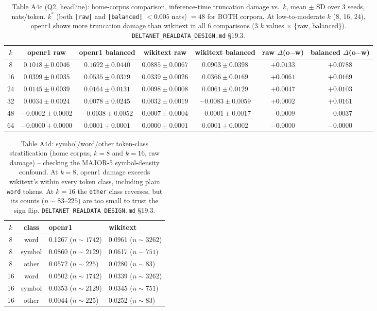 \begin{table}[htbp]
\centering
\small
\begin{tabular}{ccccccc}
\toprule
$k$ & openr1 raw & openr1 balanced & wikitext raw & wikitext balanced & raw $\Delta$(o$-$w) & balanced $\Delta$(o$-$w) \\
\midrule
8  & $0.1018\pm0.0046$ & $0.1692\pm0.0440$ & $0.0885\pm0.0067$ & $0.0903\pm0.0398$ & $+0.0133$ & $+0.0788$ \\
16 & $0.0399\pm0.0035$ & $0.0535\pm0.0379$ & $0.0339\pm0.0026$ & $0.0366\pm0.0169$ & $+0.0061$ & $+0.0169$ \\
24 & $0.0145\pm0.0039$ & $0.0164\pm0.0131$ & $0.0098\pm0.0008$ & $0.0061\pm0.0129$ & $+0.0047$ & $+0.0103$ \\
32 & $0.0034\pm0.0024$ & $0.0078\pm0.0245$ & $0.0032\pm0.0019$ & $-0.0083\pm0.0059$ & $+0.0002$ & $+0.0161$ \\
48 & $-0.0002\pm0.0002$ & $-0.0038\pm0.0052$ & $0.0007\pm0.0004$ & $-0.0001\pm0.0017$ & $-0.0009$ & $-0.0037$ \\
64 & $-0.0000\pm0.0000$ & $0.0001\pm0.0001$ & $0.0000\pm0.0001$ & $0.0001\pm0.0002$ & $-0.0000$ & $-0.0000$ \\
\bottomrule
\end{tabular}
\caption{Table A4c (Q2, headline): home-corpus comparison, inference-time
truncation damage vs.\ $k$, mean $\pm$ SD over 3 seeds, nats/token. $k^*$
(both \texttt{|raw|} and \texttt{|balanced|} $< 0.005$ nats) $= 48$ for
BOTH corpora. At low-to-moderate $k$ (8, 16, 24), openr1 shows more
truncation damage than wikitext in all 6 comparisons (3 $k$ values
$\times$ \{raw, balanced\}). \texttt{DELTANET\_REALDATA\_DESIGN.md} \S19.3.}
\end{table}

\begin{table}[htbp]
\centering
\small
\begin{tabular}{ccll}
\toprule
$k$ & class & openr1 & wikitext \\
\midrule
8  & word   & 0.1267 ($n\!\sim\!1742$) & 0.0961 ($n\!\sim\!3262$) \\
8  & symbol & 0.0860 ($n\!\sim\!2129$) & 0.0617 ($n\!\sim\!751$) \\
8  & other  & 0.0572 ($n\!\sim\!225$)  & 0.0280 ($n\!\sim\!83$) \\
16 & word   & 0.0502 ($n\!\sim\!1742$) & 0.0339 ($n\!\sim\!3262$) \\
16 & symbol & 0.0353 ($n\!\sim\!2129$) & 0.0345 ($n\!\sim\!751$) \\
16 & other  & 0.0044 ($n\!\sim\!225$)  & 0.0252 ($n\!\sim\!83$) \\
\bottomrule
\end{tabular}
\caption{Table A4d: symbol/word/other token-class stratification (home
corpus, $k{=}8$ and $k{=}16$, raw damage) -- checking the MAJOR-5
symbol-density confound. At $k{=}8$, openr1 damage exceeds wikitext's
within every token class, including plain \texttt{word} tokens. At
$k{=}16$ the \texttt{other} class reverses, but its counts
($n\!\sim\!83$--$225$) are too small to trust the sign flip.
\texttt{DELTANET\_REALDATA\_DESIGN.md} \S19.3.}
\end{table}

